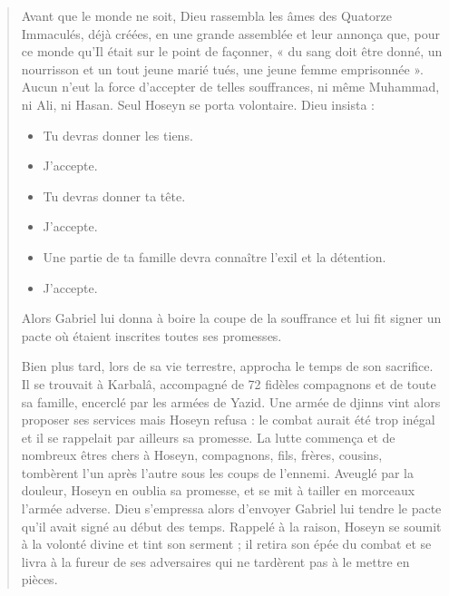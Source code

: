 \begin{quote}
    
 
Avant que le monde ne soit, Dieu rassembla les âmes des Quatorze
Immaculés, déjà créées, en une grande assemblée et leur annonça que,
pour ce monde qu'Il était sur le point de façonner, « du sang doit être
donné, un nourrisson et un tout jeune marié tués, une jeune femme
emprisonnée ». Aucun n'eut la force d'accepter de telles souffrances, ni
même Muhammad, ni Ali, ni Hasan. Seul Hoseyn se porta volontaire. Dieu
insista :
 

\begin{itemize}
\item
 
  Tu devras donner les tiens.
  
\item
  
  J'accepte.
  
\item
 
  Tu devras donner ta tête.
  
\item
 
  J'accepte.
  
\item
  
  Une partie de ta famille devra connaître l'exil et la détention.
  
\item
 
  J'accepte.
  
\end{itemize}


Alors Gabriel lui donna à boire la coupe de la souffrance et lui fit
signer un pacte où étaient inscrites toutes ses promesses.

Bien plus tard, lors de sa vie terrestre, approcha le temps de son
sacrifice. Il se trouvait à Karbalâ, accompagné de 72 fidèles compagnons
et de toute sa famille, encerclé par les armées de Yazid. Une armée de
djinns vint alors proposer ses services mais Hoseyn refusa : le combat
aurait été trop inégal et il se rappelait par ailleurs sa promesse. La
lutte commença et de nombreux êtres chers à Hoseyn, compagnons, fils,
frères, cousins, tombèrent l'un après l'autre sous les coups de
l'ennemi. Aveuglé par la douleur, Hoseyn en oublia sa promesse, et se
mit à tailler en morceaux l'armée adverse. Dieu s'empressa alors
d'envoyer Gabriel lui tendre le pacte qu'il avait signé au début des
temps. Rappelé à la raison, Hoseyn se soumit à la volonté divine et tint
son serment ; il retira son épée du combat et se livra à la fureur de
ses adversaires qui ne tardèrent pas à le mettre en pièces.
\end{quote}

